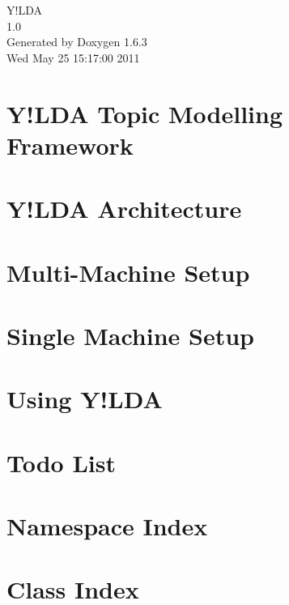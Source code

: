 \documentclass[letterpaper]{book}
\begin{document}
\hypersetup{pageanchor=false}
\begin{titlepage}
\vspace*{7cm}
\begin{center}
{\Large Y!LDA \\[1ex]\large 1.0 }\\
\vspace*{1cm}
{\large Generated by Doxygen 1.6.3}\\
\vspace*{0.5cm}
{\small Wed May 25 15:17:00 2011}\\
\end{center}
\end{titlepage}
\clearemptydoublepage
{}
\tableofcontents
\clearemptydoublepage
{}
\hypersetup{pageanchor=true}
\chapter{Y!LDA Topic Modelling Framework}
\label{index}\hypertarget{index}{}
\chapter{Y!LDA Architecture}
\label{architecture}
\hypertarget{architecture}{}

\chapter{Multi-\/Machine Setup}
\label{multi_machine_usage}
\hypertarget{multi_machine_usage}{}

\chapter{Single Machine Setup}
\label{single_machine_usage}
\hypertarget{single_machine_usage}{}

\chapter{Using Y!LDA}
\label{usage}
\hypertarget{usage}{}

\chapter{Todo List}
\label{todo}
\hypertarget{todo}{}

\chapter{Namespace Index}

\chapter{Class Index}

\end{document}
